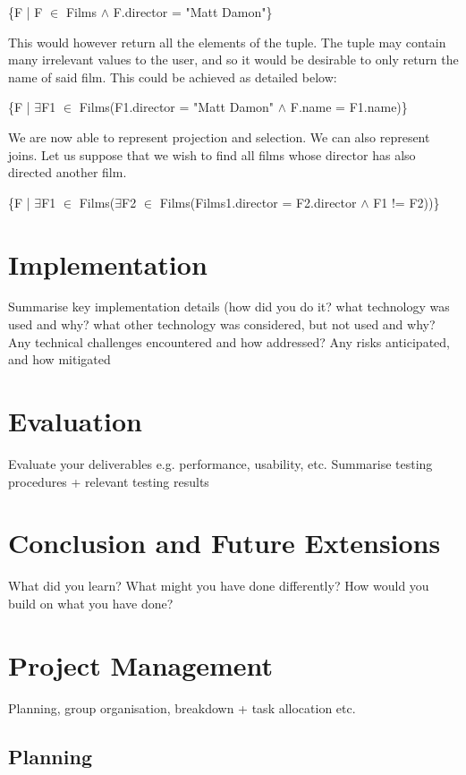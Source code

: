 \documentclass[a4wide, 11pt]{article}
\begin{document}
\{F | F $\in$ Films $\land$ F.director = "Matt Damon"\}

This would however return all the elements of the tuple. The tuple may contain
many irrelevant values to the user, and so it would be desirable to only return
the name of said film. This could be achieved as detailed below:

\{F | $\exists$F1 $\in$ Films(F1.director = "Matt Damon" $\land$ F.name =
F1.name)\}

We are now able to represent projection and selection. We can also represent
joins. Let us suppose that we wish to find all films whose director has also
directed another film.

\{F | $\exists$F1 $\in$ Films($\exists$F2 $\in$ Films(Films1.director =
F2.director $\land$ F1 != F2))\}


\section{Implementation}

        Summarise key implementation details (how did you do it? what technology was used and why? what other technology was considered, but not used and why?
        Any technical challenges encountered and how addressed?
        Any risks anticipated, and how mitigated 

\section{Evaluation}

        Evaluate your deliverables e.g. performance, usability, etc.
        Summarise testing procedures + relevant testing results 

\section{Conclusion and Future Extensions}

        What did you learn? What might you have done differently?
        How would you build on what you have done? 

\section{Project Management}

        Planning, group organisation, breakdown + task allocation etc.

\subsection{Planning}
\end{document}
